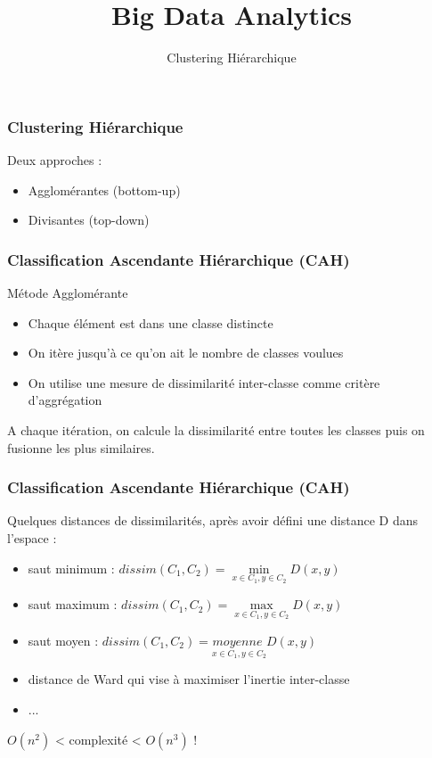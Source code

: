 \documentclass{formation}
\title{Big Data Analytics}
\subtitle{Clustering Hiérarchique}
\begin{document}
\maketitle

\begin{frame}
  \frametitle{Clustering Hiérarchique}
  Deux approches :
  \begin{itemize}
  \item Agglomérantes (bottom-up)
  \item Divisantes (top-down)
  \end{itemize}
\end{frame}

\begin{frame}
  \frametitle{Classification Ascendante Hiérarchique (CAH)}
  Métode Agglomérante
  \begin{itemize}
  \item Chaque élément est dans une classe distincte
  \item On itère jusqu'à ce qu'on ait le nombre de classes voulues
  \item On utilise une mesure de dissimilarité inter-classe comme critère d'aggrégation
  \end{itemize}
  A chaque itération, on calcule la dissimilarité entre toutes les classes puis on fusionne les plus similaires.
\end{frame}

\begin{frame}
  \frametitle{Classification Ascendante Hiérarchique (CAH)}
  Quelques distances de dissimilarités, après avoir défini une distance D dans l'espace :
  \begin{itemize}
  \item saut minimum : $dissim(C_1,C_2) = \underset{x \in C_1,y \in C_2}{\min}{D(x,y)}$
  \item saut maximum : $dissim(C_1,C_2) = \underset{x \in C_1,y \in C_2}{\max}{D(x,y)}$
  \item saut moyen : $dissim(C_1,C_2) = \underset{x \in C_1,y \in C_2}{moyenne\;}{D(x,y)}$
  \item distance de Ward qui vise à maximiser l'inertie inter-classe
  \item ...
  \end{itemize}
  $O(n^2)$ < complexité < $O(n^3)$ !
\end{frame}
\end{document}
